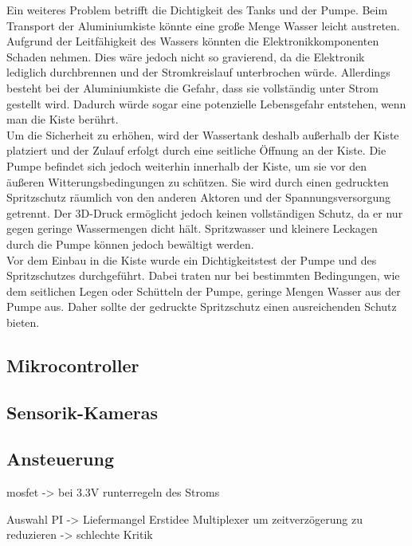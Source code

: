 Ein weiteres Problem betrifft die Dichtigkeit des Tanks und der Pumpe. Beim Transport der Aluminiumkiste könnte eine große Menge Wasser leicht austreten. Aufgrund der Leitfähigkeit des Wassers könnten die Elektronikkomponenten Schaden nehmen. Dies wäre jedoch nicht so gravierend, da die Elektronik lediglich durchbrennen und der Stromkreislauf unterbrochen würde. Allerdings besteht bei der Aluminiumkiste die Gefahr, dass sie vollständig unter Strom gestellt wird. Dadurch würde sogar eine potenzielle Lebensgefahr entstehen, wenn man die Kiste berührt.
\\
Um die Sicherheit zu erhöhen, wird der Wassertank deshalb außerhalb der Kiste platziert und der Zulauf erfolgt durch eine seitliche Öffnung an der Kiste. Die Pumpe befindet sich jedoch weiterhin innerhalb der Kiste, um sie vor den äußeren Witterungsbedingungen zu schützen. Sie wird durch einen gedruckten Spritzschutz räumlich von den anderen Aktoren und der Spannungsversorgung getrennt. Der 3D-Druck ermöglicht jedoch keinen vollständigen Schutz, da er nur gegen geringe Wassermengen dicht hält. Spritzwasser und kleinere Leckagen durch die Pumpe können jedoch bewältigt werden.
\\
Vor dem Einbau in die Kiste wurde ein Dichtigkeitstest der Pumpe und des Spritzschutzes durchgeführt. Dabei traten nur bei bestimmten Bedingungen, wie dem seitlichen Legen oder Schütteln der Pumpe, geringe Mengen Wasser aus der Pumpe aus. Daher sollte der gedruckte Spritzschutz einen ausreichenden Schutz bieten.

\subsection{Mikrocontroller}

\subsection{Sensorik-Kameras}

\subsection{Ansteuerung}

mosfet -> bei 3.3V runterregeln des Stroms

Auswahl PI -> Liefermangel
Erstidee Multiplexer um zeitverzögerung zu reduzieren -> schlechte Kritik

